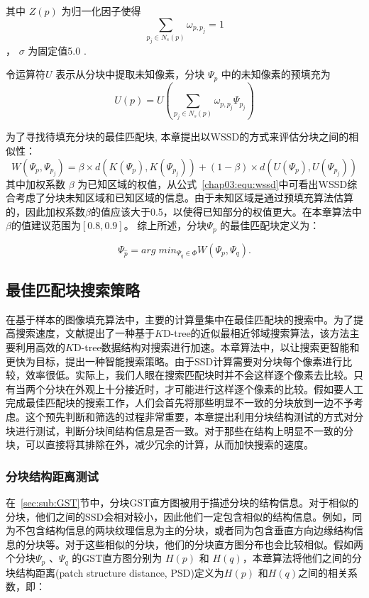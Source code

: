  其中 \(Z(p)\) 为归一化因子使得 $$\sum_{p_j\in N_s(p)}\omega_{p,p_j} = 1$$ ， \(\sigma\) 为固定值5.0 \cite{Xu:2010}.\par
 令运算符\(U\) 表示从分块中提取未知像素，分块 \(\Psi_p\) 中的未知像素的预填充为
 $$U(p)=U\left(\sum_{p_j \in N_s(p)}{\omega_{p,p_j}\Psi_{p_j}}\right)$$\par
 为了寻找待填充分块的最佳匹配块, 本章提出以WSSD的方式来评估分块之间的相似性：
 \begin{equation}
 W(\Psi_p,\Psi_{p_j})=\beta\times d(K(\Psi_p),K(\Psi_{p_j}))+(1-\beta)\times d(U(\Psi_p),U(\Psi_{p_j}))
 \label{chap03:equ:wssd}
 \end{equation}
 其中加权系数 \(\beta\) 为已知区域的权值，从公式~\ref{chap03:equ:wssd}中可看出WSSD综合考虑了分块未知区域和已知区域的信息。由于未知区域是通过预填充算法估算的，因此加权系数\(\beta\)的值应该大于0.5，以使得已知部分的权值更大。在本章算法中 \(\beta\)的值建议范围为$[0.8, 0.9]$。 综上所述，分块\(\Psi_p\) 的最佳匹配块定义为：


 $$\Psi_{\hat{p}}=arg\;min_{\Psi_q \in \Phi}{W(\Psi_p,\Psi_q)}.$$


 \subsection{最佳匹配块搜索策略}
 在基于样本的图像填充算法中，主要的计算量集中在最佳匹配块的搜索中。为了提高搜索速度，文献\cite{kwokFast}提出了一种基于$K$D-tree的近似最相近邻域搜索算法，该方法主要利用高效的$K$D-tree数据结构对搜索进行加速。本章算法中，以让搜索更智能和更快为目标，提出一种智能搜索策略。由于SSD计算需要对分块每个像素进行比较，效率很低。实际上，我们人眼在搜索匹配块时并不会这样逐个像素去比较。只有当两个分块在外观上十分接近时，才可能进行这样逐个像素的比较。假如要人工完成最佳匹配块的搜索工作，人们会首先将那些明显不一致的分块放到一边不予考虑。这个预先判断和筛选的过程非常重要，本章提出利用分块结构测试的方式对分块进行测试，判断分块间结构信息是否一致。对于那些在结构上明显不一致的分块，可以直接将其排除在外，减少冗余的计算，从而加快搜索的速度。
 \subsubsection{分块结构距离测试}
 \label{sec:subsub:PST}
 在~\ref{sec:sub:GST}节中，分块GST直方图被用于描述分块的结构信息。对于相似的分块，他们之间的SSD会相对较小，因此他们一定包含相似的结构信息。例如，同为不包含结构信息的两块纹理信息为主的分块，或者同为包含垂直方向边缘结构信息的分块等。对于这些相似的分块，他们的分块直方图分布也会比较相似。假如两个分块\(\Psi_p\) 、\(\Psi_q\) 的GST直方图分别为 \(H(p)\) 和 \(H(q)\)，本章算法将他们之间的分块结构距离(patch structure distance, PSD)定义为\(H(p)\) 和\(H(q)\)之间的相关系数，即：

